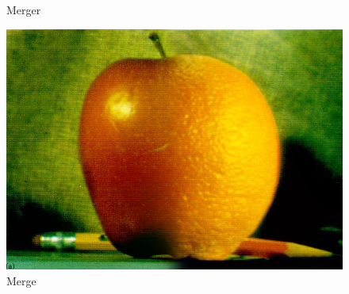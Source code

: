 \documentclass{article}
\begin{document}
    \begin{figure}[!htb]
      \caption{Merger}
    \endminipage \hfill
      \includegraphics[scale=.3]{./blending/ao/final_2.png}
      \caption{Merge}
    \endminipage \hfill
    \end{figure}
\end{document}
